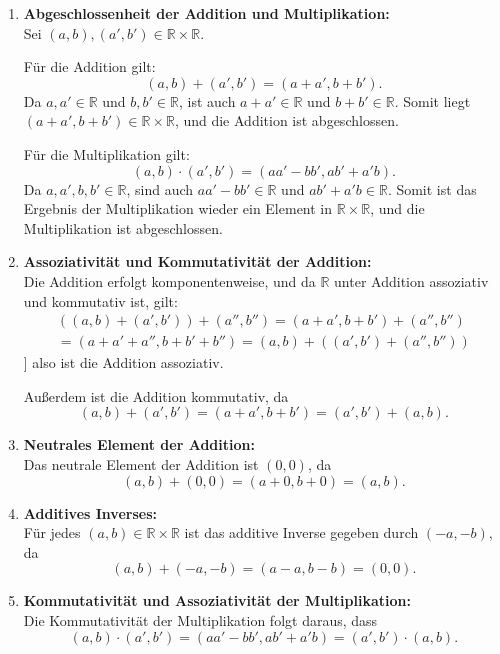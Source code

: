 \documentclass[11pt]{article}
\begin{document}
\begin{enumerate}
   \item \textbf{Abgeschlossenheit der Addition und Multiplikation:} \\
   Sei \( (a, b), (a', b') \in \mathbb{R} \times \mathbb{R} \).

   Für die Addition gilt:
   \[
   (a, b) + (a', b') = (a + a', b + b').
   \]
   Da \( a, a' \in \mathbb{R} \) und \( b, b' \in \mathbb{R} \), ist auch \( a + a' \in \mathbb{R} \) und \( b + b' \in \mathbb{R} \). Somit liegt \( (a + a', b + b') \in \mathbb{R} \times \mathbb{R} \), und die Addition ist abgeschlossen.

   Für die Multiplikation gilt:
   \[
   (a, b) \cdot (a', b') = (aa' - bb', ab' + a'b).
   \]
   Da \( a, a', b, b' \in \mathbb{R} \), sind auch \( aa' - bb' \in \mathbb{R} \) und \( ab' + a'b \in \mathbb{R} \). Somit ist das Ergebnis der Multiplikation wieder ein Element in \( \mathbb{R} \times \mathbb{R} \), und die Multiplikation ist abgeschlossen.

   \item \textbf{Assoziativität und Kommutativität der Addition:} \\
   Die Addition erfolgt komponentenweise, und da \( \mathbb{R} \) unter Addition assoziativ und kommutativ ist, gilt:
   \begin{align}
   ((a, b) + (a', b')) + (a'', b'') = (a + a', b + b') + (a'', b'') \\
   = (a + a' + a'', b + b' + b'') = (a, b) + ((a', b') + (a'', b''))
   \end{align}]
   also ist die Addition assoziativ.

   Außerdem ist die Addition kommutativ, da
   \[
   (a, b) + (a', b') = (a + a', b + b') = (a', b') + (a, b).
   \]

   \item \textbf{Neutrales Element der Addition:} \\
   Das neutrale Element der Addition ist \( (0, 0) \), da
   \[
   (a, b) + (0, 0) = (a + 0, b + 0) = (a, b).
   \]

   \item \textbf{Additives Inverses:} \\
   Für jedes \( (a, b) \in \mathbb{R} \times \mathbb{R} \) ist das additive Inverse gegeben durch \( (-a, -b) \), da
   \[
   (a, b) + (-a, -b) = (a - a, b - b) = (0, 0).
   \]

   \item \textbf{Kommutativität und Assoziativität der Multiplikation:} \\
   Die Kommutativität der Multiplikation folgt daraus, dass
   \[
   (a, b) \cdot (a', b') = (aa' - bb', ab' + a'b) = (a', b') \cdot (a, b).
   \]


\end{enumerate}
\end{document}
